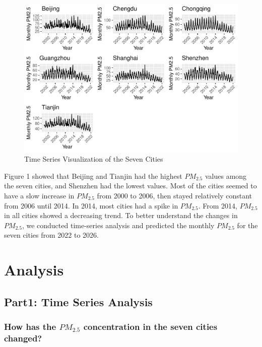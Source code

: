 \documentclass[
  12pt,
]{article}
\begin{document}
\begin{figure}
\centering
\includegraphics{LiFangRenZhang_ENV872_Project_files/figure-latex/TSA Visualization-1.pdf}
\caption{Time Series Visualization of the Seven Cities}
\end{figure}

Figure 1 showed that Beijing and Tianjin had the highest \(PM_{2.5}\)
values among the seven cities, and Shenzhen had the lowest values. Most
of the cities seemed to have a slow increase in \(PM_{2.5}\) from 2000
to 2006, then stayed relatively constant from 2006 until 2014. In 2014,
most cities had a spike in \(PM_{2.5}\). From 2014, \(PM_{2.5}\) in all
cities showed a decreasing trend. To better understand the changes in
\(PM_{2.5}\), we conducted time-series analysis and predicted the
monthly \(PM_{2.5}\) for the seven cities from 2022 to 2026.

\newpage

\hypertarget{analysis}{%
\section{Analysis}\label{analysis}}

\hypertarget{part1-time-series-analysis}{%
\subsection{Part1: Time Series
Analysis}\label{part1-time-series-analysis}}

\hypertarget{how-has-the-pm_2.5-concentration-in-the-seven-cities-changed}{%
\subsubsection{\texorpdfstring{How has the \(PM_{2.5}\) concentration in
the seven cities
changed?}{How has the PM\_\{2.5\} concentration in the seven cities changed?}}\label{how-has-the-pm_2.5-concentration-in-the-seven-cities-changed}}
\end{document}
